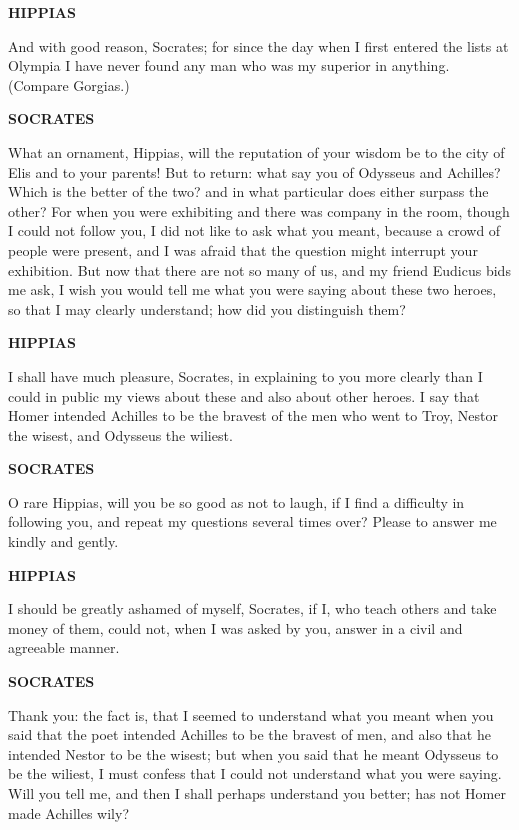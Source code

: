 \documentclass[11pt,letter]{article}
\begin{document}
\par \textbf{HIPPIAS}
\par   And with good reason, Socrates; for since the day when I first entered the lists at Olympia I have never found any man who was my superior in anything. (Compare Gorgias.)

\par \textbf{SOCRATES}
\par   What an ornament, Hippias, will the reputation of your wisdom be to the city of Elis and to your parents! But to return:  what say you of Odysseus and Achilles? Which is the better of the two? and in what particular does either surpass the other? For when you were exhibiting and there was company in the room, though I could not follow you, I did not like to ask what you meant, because a crowd of people were present, and I was afraid that the question might interrupt your exhibition. But now that there are not so many of us, and my friend Eudicus bids me ask, I wish you would tell me what you were saying about these two heroes, so that I may clearly understand; how did you distinguish them?

\par \textbf{HIPPIAS}
\par   I shall have much pleasure, Socrates, in explaining to you more clearly than I could in public my views about these and also about other heroes. I say that Homer intended Achilles to be the bravest of the men who went to Troy, Nestor the wisest, and Odysseus the wiliest.

\par \textbf{SOCRATES}
\par   O rare Hippias, will you be so good as not to laugh, if I find a difficulty in following you, and repeat my questions several times over? Please to answer me kindly and gently.

\par \textbf{HIPPIAS}
\par   I should be greatly ashamed of myself, Socrates, if I, who teach others and take money of them, could not, when I was asked by you, answer in a civil and agreeable manner.

\par \textbf{SOCRATES}
\par   Thank you:  the fact is, that I seemed to understand what you meant when you said that the poet intended Achilles to be the bravest of men, and also that he intended Nestor to be the wisest; but when you said that he meant Odysseus to be the wiliest, I must confess that I could not understand what you were saying. Will you tell me, and then I shall perhaps understand you better; has not Homer made Achilles wily?
\end{document}
